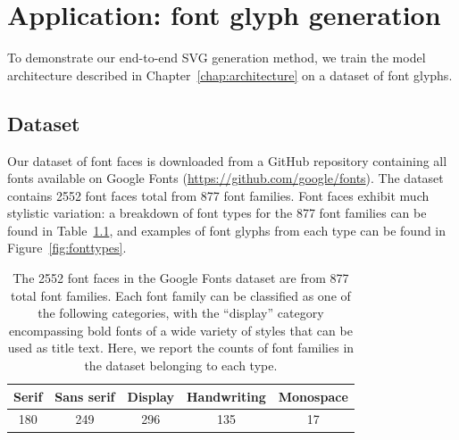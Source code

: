 \chapter{Application: font glyph generation}\label{chap:training} To demonstrate our end-to-end SVG generation method, we train the model architecture described in Chapter~\ref{chap:architecture} on a dataset of font glyphs.

\section{Dataset}\label{sec:font-data}
Our dataset of font faces is downloaded from a GitHub repository containing all fonts available on Google Fonts (\url{https://github.com/google/fonts}).
The dataset contains 2552 font faces total from 877 font families.
Font faces exhibit much stylistic variation: a breakdown of font types for the 877 font families can be found in Table~\ref{tbl:fonttypes}, and examples of font glyphs from each type can be found in Figure~\ref{fig:fonttypes}.

\begin{table}[h]
\centering
\caption[A breakdown of font types in the Google Fonts dataset]
    {The 2552 font faces in the Google Fonts dataset are from 877 total font families.
    Each font family can be classified as one of the following categories, with the ``display'' category encompassing bold fonts of a wide variety of styles that can be used as title text.
    Here, we report the counts of font families in the dataset belonging to each type.\label{tbl:fonttypes}}
\begin{tabular}{c c c c c}
\toprule
    Serif & Sans serif & Display & Handwriting & Monospace \\ \midrule
    180 & 249 & 296 & 135 & 17
\end{tabular}
\end{table}


